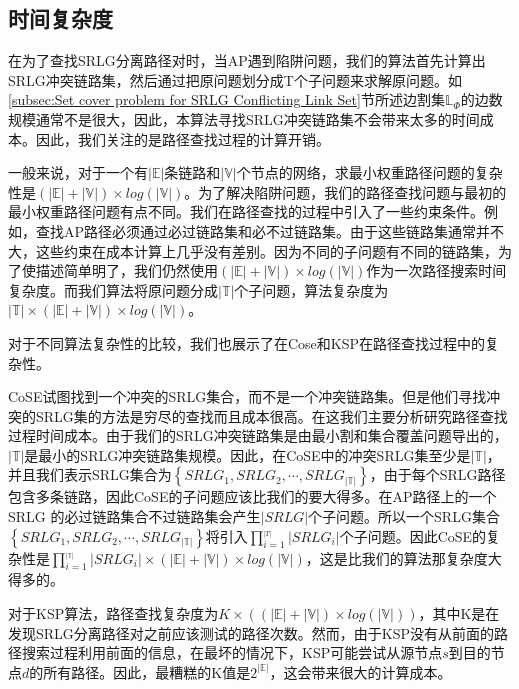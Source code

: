 

\subsection{时间复杂度}
在为了查找SRLG分离路径对时，当AP遇到陷阱问题，我们的算法首先计算出SRLG冲突链路集，然后通过把原问题划分成T个子问题来求解原问题。如\ref{subsec:Set cover problem for SRLG Conflicting Link Set}节所述边割集$\mathbb{L}_{\Phi}$的边数规模通常不是很大，因此，本算法寻找SRLG冲突链路集不会带来太多的时间成本。因此，我们关注的是路径查找过程的计算开销。

一般来说，对于一个有$|\mathbb{E}|$条链路和$|\mathbb{V}|$个节点的网络，求最小权重路径问题的复杂性是$(|\mathbb{E}|+|\mathbb{V}|)\times log(|\mathbb{V}|)$。为了解决陷阱问题，我们的路径查找问题与最初的最小权重路径问题有点不同。我们在路径查找的过程中引入了一些约束条件。例如，查找AP路径必须通过必过链路集和必不过链路集。由于这些链路集通常并不大，这些约束在成本计算上几乎没有差别。因为不同的子问题有不同的链路集，为了使描述简单明了，我们仍然使用$(|\mathbb{E}|+|\mathbb{V}|)\times log(|\mathbb{V}|)$作为一次路径搜索时间复杂度。而我们算法将原问题分成$|\mathbb{T}|$个子问题，算法复杂度为$|\mathbb{T}|\times(|\mathbb{E}|+|\mathbb{V}|)\times log(|\mathbb{V}|)$。


对于不同算法复杂性的比较，我们也展示了在Cose\cite{rostami2007cose}和KSP\cite{eppstein1998finding}在路径查找过程中的复杂性。

CoSE试图找到一个冲突的SRLG集合，而不是一个冲突链路集。但是他们寻找冲突的SRLG集的方法是穷尽的查找而且成本很高。在这我们主要分析研究路径查找过程时间成本。由于我们的SRLG冲突链路集是由最小割和集合覆盖问题导出的，$|\mathbb{T}|$是最小的SRLG冲突链路集规模。因此，在CoSE中的冲突SRLG集至少是$|\mathbb{T}|$，并且我们表示SRLG集合为$\left\{ {SRL{G_1},SRL{G_2}, \cdots ,SRL{G_{|\mathbb{T}|}}} \right\}$，由于每个SRLG路径包含多条链路，因此CoSE的子问题应该比我们的要大得多。在AP路径上的一个SRLG 的必过链路集合不过链路集会产生$|SRLG|$个子问题。所以一个SRLG集合$\left\{ {SRL{G_1},SRL{G_2}, \cdots ,SRL{G_{|\mathbb{T}|}}} \right\}$将引入$\prod\limits_{i = 1}^{_{\left| T \right|}} {\left| {SRL{G_i}} \right|}$个子问题。因此CoSE的复杂性是$\prod\limits_{i = 1}^{_{|\mathbb{T}|}} {\left| {SRL{G_i}} \right|}\times (|\mathbb{E}|+|\mathbb{V}|)\times log(|\mathbb{V}|)$，这是比我们的算法那复杂度大得多的。

对于KSP算法\cite{eppstein1998finding}，路径查找复杂度为$K\times ((|\mathbb{E}|+|\mathbb{V}|)\times log(|\mathbb{V}|))$，其中K是在发现SRLG分离路径对之前应该测试的路径次数。然而，由于KSP没有从前面的路径搜索过程利用前面的信息，在最坏的情况下，KSP可能尝试从源节点$s$到目的节点$d$的所有路径。因此，最糟糕的K值是$2^{|\mathbb{E}|}$，这会带来很大的计算成本。
